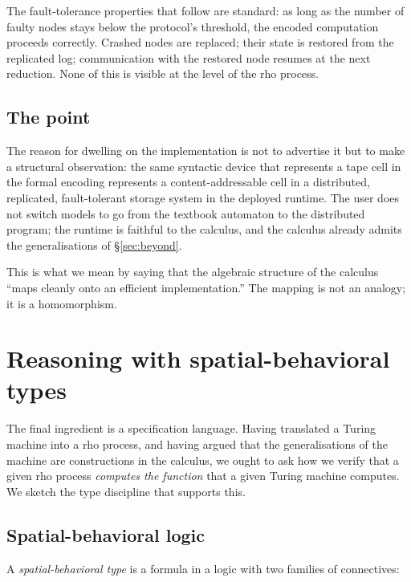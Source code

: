 \documentclass[11pt]{article}
\theoremstyle{plain}
\theoremstyle{definition}
\theoremstyle{remark}
\begin{document}
The fault-tolerance properties that follow are standard: as long as the
number of faulty nodes stays below the protocol's threshold, the
encoded computation proceeds correctly. Crashed nodes are replaced;
their state is restored from the replicated log; communication with the
restored node resumes at the next reduction. None of this is visible at
the level of the rho process.

\subsection{The point}

The reason for dwelling on the implementation is not to advertise it but
to make a structural observation: the same syntactic device that
represents a tape cell in the formal encoding represents a
content-addressable cell in a distributed, replicated, fault-tolerant
storage system in the deployed runtime. The user does not switch models
to go from the textbook automaton to the distributed program; the
runtime is faithful to the calculus, and the calculus already admits the
generalisations of \S\ref{sec:beyond}.

This is what we mean by saying that the algebraic structure of the
calculus ``maps cleanly onto an efficient implementation.'' The mapping
is not an analogy; it is a homomorphism.

\section{Reasoning with spatial-behavioral types}\label{sec:types}

The final ingredient is a specification language. Having translated a
Turing machine into a rho process, and having argued that the
generalisations of the machine are constructions in the calculus, we
ought to ask how we verify that a given rho process \emph{computes the
function} that a given Turing machine computes. We sketch the type
discipline that supports this.

\subsection{Spatial-behavioral logic}

A \emph{spatial-behavioral type} is a formula in a logic with two
families of connectives:
\end{document}
